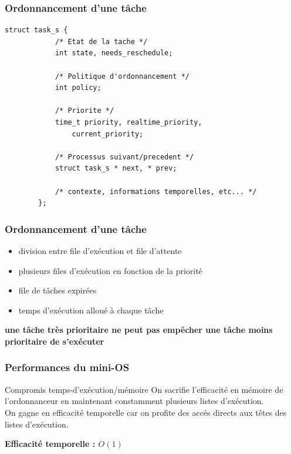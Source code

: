 \documentclass{beamer}
\begin{document}
\begin{frame}[fragile]
    \frametitle{Ordonnancement d'une tâche}
    \begin{lstlisting}[caption=Représentation structurelle d'un processus]
        struct task_s {
            /* Etat de la tache */
            int state, needs_reschedule;

            /* Politique d'ordonnancement */
            int policy;

            /* Priorite */
            time_t priority, realtime_priority,
                current_priority;

            /* Processus suivant/precedent */
            struct task_s * next, * prev;

            /* contexte, informations temporelles, etc... */
        };
    \end{lstlisting}
\end{frame}

\begin{frame}
    \frametitle{Ordonnancement d'une tâche}

    \begin{itemize}
        \item division entre file d'exécution et file d'attente
        \item plusieurs files d'exécution en fonction de la priorité
        \item file de tâches expirées
        \item temps d'exécution alloué à chaque tâche
    \end{itemize}

    \begin{center}
        \bfseries
        une tâche très prioritaire ne peut pas empêcher une tâche moins
        prioritaire de s'exécuter
    \end{center}
\end{frame}

\begin{frame}
    \frametitle{Performances du mini-OS}

    \begin{block}{Compromis temps-d'exécution/mémoire}
        On sacrifie l'efficacité en mémoire de l'ordonnanceur en maintenant
        constamment plusieurs listes d'exécution. \\
        On gagne en efficacité temporelle car on profite des accés directs aux
        têtes des listes d'exécution.
    \end{block}

    \begin{center}
        \bfseries
        Efficacité temporelle : $O(1)$
    \end{center}
\end{frame}
\end{document}
